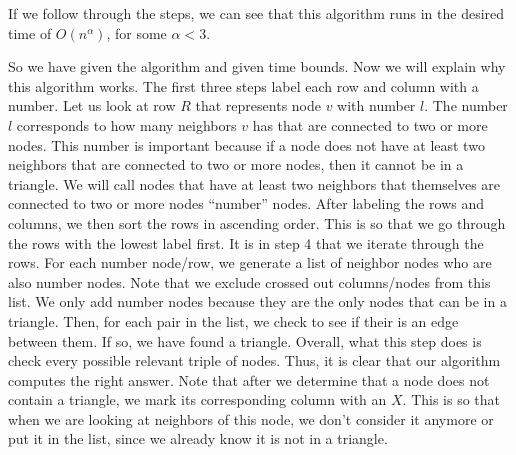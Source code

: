 \documentclass{article}
\begin{document}
\begin{description}
        If we follow through the steps, we can see that this algorithm runs in
        the desired time of $O(n^{\alpha})$, for some $\alpha < 3$.

        So we have given the algorithm and given time bounds. Now we will
        explain why this algorithm works. The first three steps label each row
        and column with a number. Let us look at row $R$ that represents node
        $v$ with number $l$. The number $l$ corresponds to how many neighbors
        $v$ has that are connected to two or more nodes. This number is
        important because if a node does not have at least two neighbors
        that are connected to two or more nodes, then it cannot be in a
        triangle. We will call nodes that have at least two neighbors that
        themselves are connected to two or more nodes ``number'' nodes.
        After labeling the rows and columns, we then sort the rows in
        ascending order. This is so that we go through the rows with the lowest
        label first. It is in step 4 that we iterate through the rows.
        For each number node/row, we generate a list of neighbor nodes who are
        also number nodes. Note that we exclude crossed out columns/nodes from
        this list. We only add number nodes because they are the only nodes that
        can be in a triangle. Then, for each pair in the list, we check to see if
        their is an edge between them. If so, we have found a triangle. Overall,
        what this step does is check every possible relevant triple of nodes.
        Thus, it is clear that our algorithm computes the right answer. Note
        that after we determine that a node does not contain a
        triangle, we mark its corresponding column with an $X$. This is so that
        when we are looking at neighbors of this node, we don't consider it
        anymore or put it in the list, since we already know it is not in a
        triangle.
        \end{description}
\newpage

\end{document}
